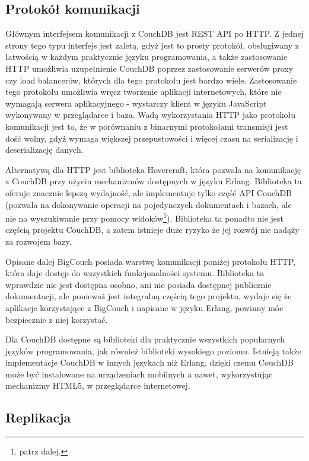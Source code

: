 \subsection*{Protokół komunikacji}

Głównym interfejsem komunikacji z CouchDB jest REST API po HTTP.
Z jednej strony tego typu interfejs jest zaletą, gdyż jest to prosty protokół, obsługiwany z łatwością w każdym praktycznie języku programowania, a także zastosowanie HTTP umożliwia uzupełnienie CouchDB poprzez zastosowanie serwerów proxy czy load balancerów, których dla tego protokołu jest bardzo wiele.
Zastosowanie tego protokołu umożliwia wręcz tworzenie aplikacji internetowych, które nie wymagają serwera aplikacyjnego - wystarczy klient w języku JavaScript wykonywany w przeglądarce i baza.
Wadą wykorzystania HTTP jako protokołu komunikacji jest to, że w porównaniu z binarnymi protokołami transmisji jest dość wolny, gdyż wymaga większej przepustowości i więcej czasu na serializację i deserializację danych.

Alternatywą dla HTTP jest biblioteka Hovercraft, która pozwala na komunikację z CouchDB przy użyciu mechanizmów dostępnych w języku Erlang.
Biblioteka ta oferuje znacznie lepszą wydajność, ale implementuje tylko część API CouchDB (pozwala na dokonywanie operacji na pojedynczych dokumentach i bazach, ale nie na wyszukiwanie przy pomocy widoków\footnote{patrz dalej.}).
Biblioteka ta ponadto nie jest częścią projektu CouchDB, a zatem istnieje duże ryzyko że jej rozwój nie nadąży za rozwojem bazy.

Opisane dalej BigCouch posiada warstwę komunikacji poniżej protokołu HTTP, która daje dostęp do wszystkich funkcjonalności systemu.
Biblioteka ta wprawdzie nie jest dostępna osobno, ani nie posiada dostępnej publicznie dokumentacji, ale ponieważ jest integralną częścią tego projektu, wydaje się że aplikacje korzystające z BigCouch i napisane w języku Erlang, powinny móc bezpiecznie z niej korzystać.

Dla CouchDB dostępne są biblioteki dla praktycznie wszystkich popularnych języków programowania, jak również biblioteki wysokiego poziomu.
Istnieją także implementacje CouchDB w innych językach niż Erlang, dzięki czemu CouchDB może być instalowane na urządzeniach mobilnych a nawet, wykorzystując mechanizmy HTML5, w przeglądarce internetowej.

\subsection*{Replikacja}

